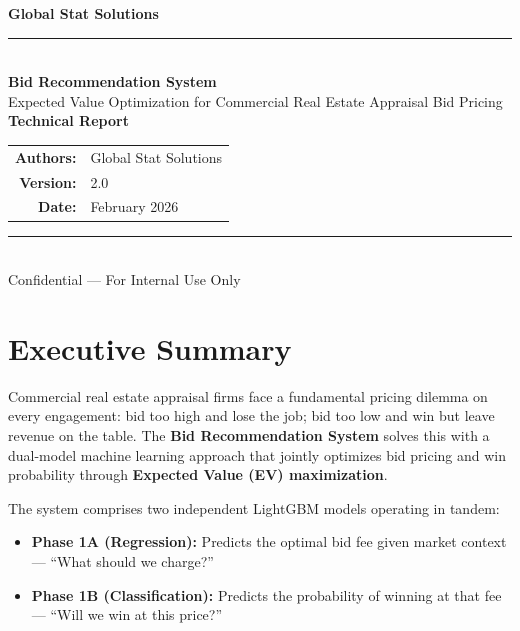 \documentclass[12pt,a4paper]{article}
\begin{document}
\begin{titlepage}
\centering
\vspace*{2cm}

{\Huge\bfseries\color{gssblue} Global Stat Solutions}\\[0.5cm]
\rule{\textwidth}{1.5pt}\\[1.5cm]

{\LARGE\bfseries Bid Recommendation System}\\[0.4cm]
{\Large\color{gssgray} Expected Value Optimization for Commercial Real Estate Appraisal Bid Pricing}\\[2.5cm]

{\large\bfseries Technical Report}\\[1.5cm]

\begin{tabular}{rl}
\textbf{Authors:} & Global Stat Solutions \\[0.5cm]
\textbf{Version:}  & 2.0 \\[0.5cm]
\textbf{Date:}     & February 2026 \\
\end{tabular}

\vfill

\rule{\textwidth}{1.5pt}\\[0.3cm]
{\small\color{gssgray} Confidential --- For Internal Use Only}
\end{titlepage}

\tableofcontents
\newpage

\section{Executive Summary}

Commercial real estate appraisal firms face a fundamental pricing dilemma on every engagement: bid too high and lose the job; bid too low and win but leave revenue on the table. The \textbf{Bid Recommendation System} solves this with a dual-model machine learning approach that jointly optimizes bid pricing and win probability through \textbf{Expected Value (EV) maximization}.

The system comprises two independent LightGBM models operating in tandem:
\begin{itemize}[nosep]
    \item \textbf{Phase 1A (Regression):} Predicts the optimal bid fee given market context --- ``What should we charge?''
    \item \textbf{Phase 1B (Classification):} Predicts the probability of winning at that fee --- ``Will we win at this price?''
\end{itemize}
\end{document}
